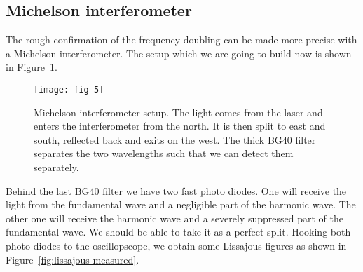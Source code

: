 \documentclass[11pt, english, fleqn, DIV=15, headinclude, BCOR=2cm]{scrreprt}
\begin{document}


\subsection{Michelson interferometer}

The rough confirmation of the frequency doubling can be made more precise with
a Michelson interferometer. The setup which we are going to build now is shown
in Figure~\ref{fig:fig-5}.


\begin{figure}
    \centering
    \texttt{[image: fig-5]}
    \caption{%
        Michelson interferometer setup. The light comes from the laser and
        enters the interferometer from the north. It is then split to east and
        south, reflected back and exits on the west. The thick BG40 filter
        separates the two wavelengths such that we can detect them separately.
        \parencite[Figure~5]{lab-course/doubling/manual}
    }
    \label{fig:fig-5}
\end{figure}

Behind the last BG40 filter we have two fast photo diodes. One will receive the
light from the fundamental wave and a negligible part of the harmonic wave. The
other one will receive the harmonic wave and a severely suppressed part of the
fundamental wave. We should be able to take it as a perfect split. Hooking both
photo diodes to the oscillopscope, we obtain some Lissajous figures as shown in
Figure~\ref{fig:lissajous-measured}.


\end{document}
